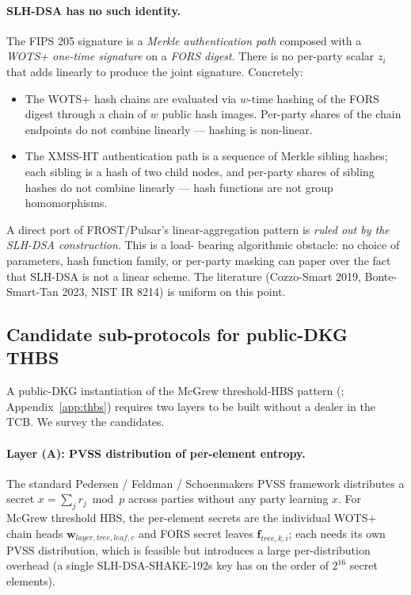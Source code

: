 \paragraph{SLH-DSA has no such identity.} The FIPS 205 signature is a
\emph{Merkle authentication path} composed with a \emph{WOTS+
one-time signature} on a \emph{FORS digest}. There is no per-party
scalar $z_i$ that adds linearly to produce the joint signature.
Concretely:
\begin{itemize}[nosep,leftmargin=2em]
  \item The WOTS+ hash chains are evaluated via $w$-time hashing of
        the FORS digest through a chain of $w$ public hash images.
        Per-party shares of the chain endpoints do not combine
        linearly --- hashing is non-linear.
  \item The XMSS-HT authentication path is a sequence of Merkle
        sibling hashes; each sibling is a hash of two child nodes,
        and per-party shares of sibling hashes do not combine
        linearly --- hash functions are not group homomorphisms.
\end{itemize}

A direct port of FROST/Pulsar's linear-aggregation pattern is
\emph{ruled out by the SLH-DSA construction}. This is a load-
bearing algorithmic obstacle: no choice of parameters, hash
function family, or per-party masking can paper over the fact that
SLH-DSA is not a linear scheme. The literature (Cozzo-Smart 2019,
Bonte-Smart-Tan 2023, NIST IR 8214) is uniform on this point.

\subsection{Candidate sub-protocols for public-DKG THBS}
\label{sec:fullmpc:topology}

A public-DKG instantiation of the McGrew threshold-HBS pattern
(\cite{mcgrew2019}; Appendix~\ref{app:thbs}) requires two layers
to be built without a dealer in the TCB. We survey the candidates.

\paragraph{Layer (A): PVSS distribution of per-element entropy.}
The standard Pedersen / Feldman / Schoenmakers PVSS
\cite{schoenmakers1999} framework distributes a secret $x =
\sum_j r_j \bmod p$ across parties without any party learning
$x$. For McGrew threshold HBS, the per-element secrets are the
individual WOTS+ chain heads $\mathbf{w}_{\mathit{layer},
\mathit{tree}, \mathit{leaf}, c}$ and FORS secret leaves
$\mathbf{f}_{\mathit{tree}, k, i}$; each needs its own PVSS
distribution, which is feasible but introduces a large
per-distribution overhead (a single SLH-DSA-SHAKE-192s key has
on the order of $2^{16}$ secret elements).

